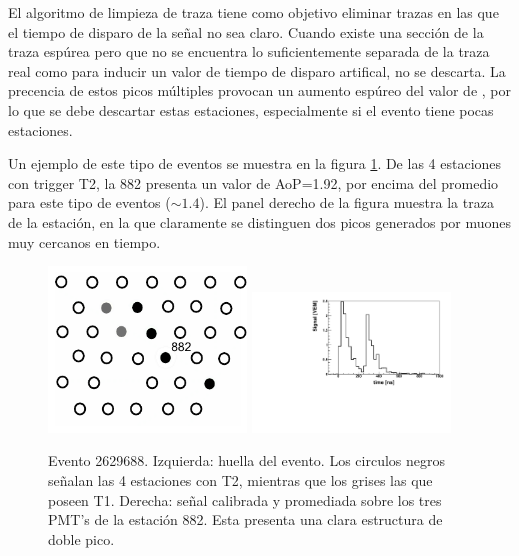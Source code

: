 	El algoritmo de limpieza de traza tiene como objetivo eliminar trazas en las que el tiempo de disparo de la señal no sea claro. 
	Cuando existe una sección de la traza espúrea pero que no se encuentra lo suficientemente separada de la traza real como para inducir un valor de tiempo de disparo artifical, no se descarta.
	La precencia de estos picos múltiples provocan un aumento espúreo del valor de \aop{}, por lo que se debe descartar estas estaciones, especialmente si el evento tiene pocas estaciones.
	
	Un ejemplo de este tipo de eventos se muestra en la figura \ref{fig:doublePeakEvent}.
	De las 4 estaciones con trigger T2, la 882 presenta un valor de AoP=1.92, por encima del promedio para este tipo de eventos ($\sim1.4$). 
	El panel derecho de la figura muestra la traza de la estación, en la que claramente se distinguen dos picos generados por muones muy cercanos en tiempo.
	\begin{figure}[ht]
	\begin{center}
	\includegraphics[width=0.47\textwidth]{fig/seleccionAuger/2629688_nice}
	\hfill
	\includegraphics[width=0.47\textwidth]{fig/seleccionAuger/ev2629688_pmtAvg_anode}
	\caption{Evento 2629688. Izquierda: huella del evento. Los circulos negros señalan las 4 estaciones con T2, mientras que los grises las que poseen T1. Derecha: señal calibrada y promediada sobre los tres PMT's de la estación 882. Esta presenta una clara estructura de doble pico. }
	\label{fig:doublePeakEvent}
	\end{center}
	\end{figure}
	
